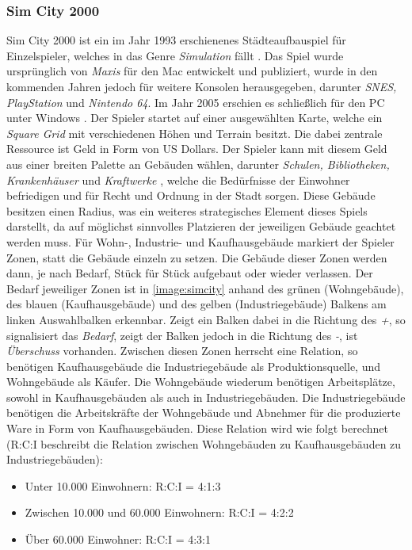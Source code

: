 \subsubsection{Sim City 2000}
Sim City 2000 ist ein im Jahr 1993 erschienenes Städteaufbauspiel für Einzelspieler, welches in das Genre \textit{Simulation} fällt \cite{simcity:ea}. Das Spiel wurde ursprünglich von \textit{Maxis} für den Mac entwickelt und publiziert, wurde in den kommenden Jahren jedoch für weitere Konsolen herausgegeben, darunter \textit{SNES, PlayStation} und \textit{Nintendo 64}. Im Jahr 2005 erschien es schließlich für den PC unter Windows \cite{simcity:igdb}. Der Spieler startet auf einer ausgewählten Karte, welche ein \textit{Square Grid} mit verschiedenen Höhen und Terrain besitzt. Die dabei zentrale Ressource ist Geld in Form von US Dollars. Der Spieler kann mit diesem Geld aus einer breiten Palette an Gebäuden wählen, darunter \textit{Schulen, Bibliotheken, Krankenhäuser} und \textit{Kraftwerke} \cite*[]{simcity:igdb}, welche die Bedürfnisse der Einwohner befriedigen und für Recht und Ordnung in der Stadt sorgen. Diese Gebäude besitzen einen Radius, was ein weiteres strategisches Element dieses Spiels darstellt, da auf möglichst sinnvolles Platzieren der jeweiligen Gebäude geachtet werden muss. Für Wohn-, Industrie- und Kaufhausgebäude markiert der Spieler Zonen, statt die Gebäude einzeln zu setzen. Die Gebäude dieser Zonen werden dann, je nach Bedarf, Stück für Stück aufgebaut oder wieder verlassen. Der Bedarf jeweiliger Zonen ist in \autoref{image:simcity} anhand des grünen (Wohngebäude), des blauen (Kaufhausgebäude) und des gelben (Industriegebäude) Balkens am linken Auswahlbalken erkennbar. Zeigt ein Balken dabei in die Richtung des \textit{+}, so signalisiert das \textit{Bedarf}, zeigt der Balken jedoch in die Richtung des \textit{-}, ist \textit{Überschuss} vorhanden. Zwischen diesen Zonen herrscht eine Relation, so benötigen Kaufhausgebäude die Industriegebäude als Produktionsquelle, und Wohngebäude als Käufer. Die Wohngebäude wiederum benötigen Arbeitsplätze, sowohl in Kaufhausgebäuden als auch in Industriegebäuden. Die Industriegebäude benötigen die Arbeitskräfte der Wohngebäude und Abnehmer für die produzierte Ware in Form von Kaufhausgebäuden. Diese Relation wird wie folgt berechnet (R:C:I beschreibt die Relation zwischen Wohngebäuden zu Kaufhausgebäuden zu Industriegebäuden): 
\begin{itemize}
    \item Unter 10.000 Einwohnern: R:C:I = 4:1:3
    \item Zwischen 10.000 und 60.000 Einwohnern: R:C:I = 4:2:2
    \item Über 60.000 Einwohner: R:C:I = 4:3:1 \cite*[]{simcity:somacon}
\end{itemize}
